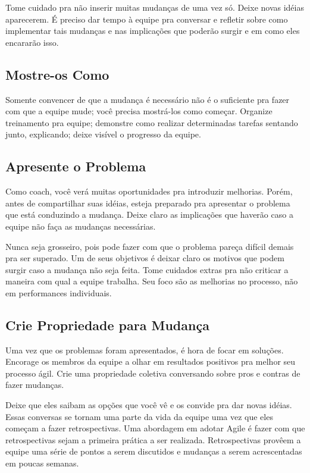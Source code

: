 \documentclass[a4paper, 10pt, font=plain]{abnt}
\begin{document}
Tome cuidado pra não inserir muitas mudanças de uma vez só. Deixe novas idéias aparecerem. É preciso dar tempo à equipe pra conversar e refletir sobre como implementar tais mudanças e nas implicações que poderão surgir e em como eles encararão isso.


\subsection{Mostre-os Como}
Somente convencer de que a mudança é necessário não é o suficiente pra fazer com que a equipe mude; você precisa mostrá-los como começar. Organize treinamento pra equipe; demonstre como realizar determinadas tarefas sentando junto, explicando; deixe visível o progresso da equipe.


\subsection{Apresente o Problema}
Como coach, você verá muitas oportunidades pra introduzir melhorias. Porém, antes de compartilhar suas idéias, esteja preparado pra apresentar o problema que está conduzindo a mudança. Deixe claro as implicações que haverão caso a equipe não faça as mudanças necessárias.

Nunca seja grosseiro, pois pode fazer com que o problema pareça difícil demais pra ser superado. Um de seus objetivos é deixar claro os motivos que podem surgir caso a mudança não seja feita. Tome cuidados extras pra não criticar a maneira com qual a equipe trabalha. Seu foco são as melhorias no processo, não em performances individuais.


\subsection{Crie Propriedade para Mudança}
Uma vez que os problemas foram apresentados, é hora de focar em soluções. Encorage os membros da equipe a olhar em resultados positivos pra melhor seu processo ágil. Crie uma propriedade coletiva conversando sobre pros e contras de fazer mudanças.

Deixe que eles saibam as opções que você vê e os convide pra dar novas idéias. Essas conversas se tornam uma parte da vida da equipe uma vez que eles começam a fazer retrospectivas. Uma abordagem em adotar Agile é fazer com que retrospectivas sejam a primeira prática a ser realizada. Retrospectivas provêem a equipe uma série de pontos a serem discutidos e mudanças a serem acrescentadas em poucas semanas.
\end{document}
